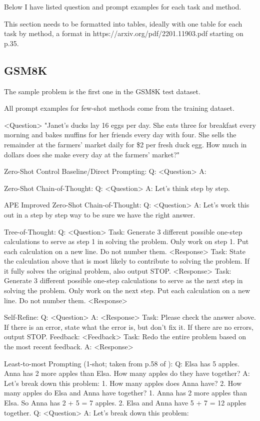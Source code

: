 \documentclass[11pt]{article}
\begin{document}
Below I have listed question and prompt examples for each task and method.

This section needs to be formatted into tables, ideally with one table for each task by method, a format in https://arxiv.org/pdf/2201.11903.pdf starting on p.35.

\subsection{GSM8K}

The sample problem is the first one in the GSM8K test dataset. \cite{cobbe_training_2021}

All prompt examples for few-shot methods come from the training dataset.

<Question> "Janet's ducks lay 16 eggs per day. She eats three for breakfast every morning and bakes muffins for her friends every day with four. She sells the remainder at the farmers' market daily for \$2 per fresh duck egg. How much in dollars does she make every day at the farmers' market?"

Zero-Shot Control Baseline/Direct Prompting:
Q: <Question>
A:

Zero-Shot Chain-of-Thought:
Q: <Question>
A: Let's think step by step.

APE Improved Zero-Shot Chain-of-Thought:
Q: <Question>
A: Let's work this out in a step by step way to be sure we have the right answer.

Tree-of-Thought: 
Q: <Question>
Task: Generate 3 different possible one-step calculations to serve as step 1 in solving the problem. Only work on step 1. Put each calculation on a new line. Do not number them.
<Response>
Task: State the calculation above that is most likely to contribute to solving the problem. If it fully solves the original problem, also output STOP.
<Response>
Task: Generate 3 different possible one-step calculations to serve as the next step in solving the problem. Only work on the next step. Put each calculation on a new line. Do not number them.
<Response>

Self-Refine:
Q: <Question>
A: <Response>
Task: Please check the answer above. If there is an error, state what the error is, but don't fix it. If there are no errors, output STOP.
Feedback: <Feedback>
Task: Redo the entire problem based on the most recent feedback.
A: <Response>

Least-to-most Prompting (1-shot; taken from p.58 of \citealp{zhou_least--most_2023}):
Q: Elsa has 5 apples. Anna has 2 more apples than Elsa. How many apples do they have together?
A: Let's break down this problem: 1. How many apples does Anna have? 2. How many apples do Elsa and Anna have together?
1. Anna has 2 more apples than Elsa. So Anna has 2 + 5 = 7 apples.
2. Elsa and Anna have 5 + 7 = 12 apples together.
Q: <Question>
A: Let's break down this problem:
\end{document}
